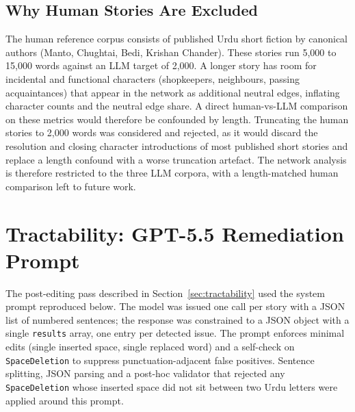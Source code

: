 \documentclass[11pt]{article}
\begin{document}
\subsection{Why Human Stories Are Excluded}
\label{app:human_exclusion}

The human reference corpus consists of published Urdu
short fiction by canonical authors (Manto, Chughtai,
Bedi, Krishan Chander). These stories run
5{,}000 to 15{,}000 words against an LLM target of
2{,}000. A longer story has room for incidental and
functional characters (shopkeepers, neighbours, passing
acquaintances) that appear in the network as additional
neutral edges, inflating character counts and the
neutral edge share. A direct human-vs-LLM comparison on
these metrics would therefore be confounded by length.
Truncating the human stories to 2{,}000 words was
considered and rejected, as it would discard the
resolution and closing character introductions of most
published short stories and replace a length confound
with a worse truncation artefact. The network analysis
is therefore restricted to the three LLM corpora, with a
length-matched human comparison left to future work.
\section{Tractability: GPT-5.5 Remediation Prompt}
\label{app:tractability_prompt}

The post-editing pass described in
Section~\ref{sec:tractability} used the system prompt
reproduced below. The model was issued one call per
story with a JSON list of numbered sentences; the
response was constrained to a JSON object with a single
\texttt{results} array, one entry per detected issue.
The prompt enforces minimal edits (single inserted
space, single replaced word) and a self-check on
\texttt{SpaceDeletion} to suppress punctuation-adjacent
false positives. Sentence splitting, JSON parsing and a
post-hoc validator that rejected any
\texttt{SpaceDeletion} whose inserted space did not sit
between two Urdu letters were applied around this
prompt.
\end{document}
